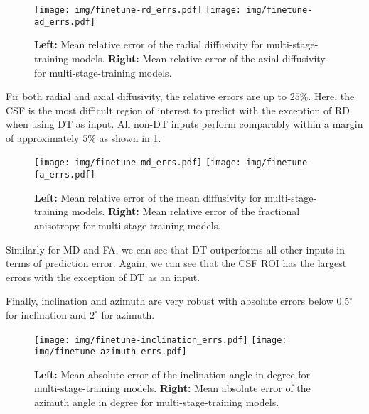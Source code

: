 \begin{figure}[h]
   \begin{center}
      \texttt{[image: img/finetune-rd\_errs.pdf]}
      \texttt{[image: img/finetune-ad\_errs.pdf]}
   \end{center}
   \caption{
      \textbf{Left:} Mean relative error of the radial diffusivity for multi-stage-training models.
      \textbf{Right:} Mean relative error of the axial diffusivity for multi-stage-training models.
   }
   \label{finetune-rdad}
\end{figure}
Fir both radial and axial diffusivity, the relative errors are up to $25 \%$.
Here, the CSF is the most difficult region of interest to predict with the exception of RD when using DT as input.
All non-DT inputs perform comparably within a margin of approximately $5\%$ as shown in \ref{finetune-rdad}.

\begin{figure}[h]
   \begin{center}
      \texttt{[image: img/finetune-md\_errs.pdf]}
      \texttt{[image: img/finetune-fa\_errs.pdf]}
   \end{center}
   \caption{
      \textbf{Left:} Mean relative error of the mean diffusivity for multi-stage-training models.
      \textbf{Right:} Mean relative error of the fractional anisotropy for multi-stage-training models.
   }
   \label{finetune-mdfa}
\end{figure}
Similarly for MD and FA, we can see that DT outperforms all other inputs in terms of prediction error.
Again, we can see that the CSF ROI has the largest errors with the exception of DT as an input.

Finally, inclination and azimuth are very robust with absolute errors below $0.5^\circ$ for inclination and $2^\circ$ for azimuth.
\begin{figure}[h]
   \begin{center}
      \texttt{[image: img/finetune-inclination\_errs.pdf]}
      \texttt{[image: img/finetune-azimuth\_errs.pdf]}
   \end{center}
   \caption{
      \textbf{Left:} Mean absolute error of the inclination angle in degree for multi-stage-training models.
      \textbf{Right:} Mean absolute error of the azimuth angle in degree for multi-stage-training models.
   }
   \label{finetune-incazi}
\end{figure}


